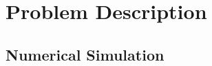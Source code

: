 \glsresetall
 \graphicspath{{figures/analysing/}}
%
		
		
\part{Problem Description}\label{pt:problem_description} 
\graphicspath{{figures/design/}}
	\chapter{Numerical Simulation}\label{ch:numerical}
		
		  
		 
		


\graphicspath{{figures/tests/}}


% 
%

\glsresetall
\appendix %

 \graphicspath{{figures/appendix/}}




